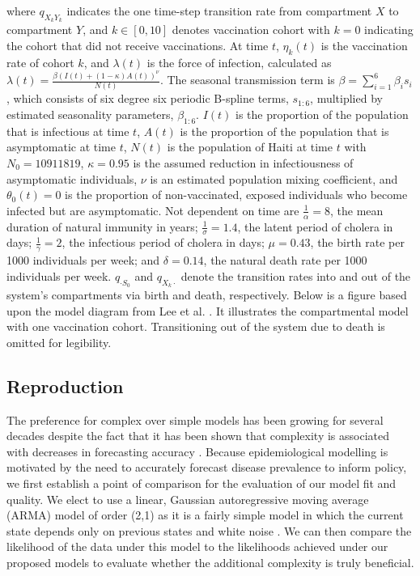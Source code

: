 \documentclass[12pt]{article}
\begin{document}
\noindent where $q_{X_kY_k}$ indicates the one time-step transition rate from compartment $X$ to compartment $Y$, and $k \in [0, 10]$ denotes vaccination cohort with $k = 0$ indicating the cohort that did not receive vaccinations. At time $t$, $\eta_k(t)$ is the vaccination rate of cohort $k$, and $\lambda (t)$ is the force of infection, calculated as $\lambda(t) = \frac{\beta(I(t) + (1-\kappa)A(t))^\nu}{N(t)}$. The seasonal transmission term is $\beta = \sum_{i = 1}^6 \beta_i s_i$, which consists of six degree six periodic B-spline terms, $s_{1:6}$, multiplied by estimated seasonality parameters, $\beta_{1:6}$. $I(t)$ is the proportion of the population that is infectious at time $t$, $A(t)$ is the proportion of the population that is asymptomatic at time $t$, $N(t)$ is the population of Haiti at time $t$ with $N_0 = 10911819$, $\kappa = 0.95$ is the assumed reduction in infectiousness of asymptomatic individuals, $\nu$ is an estimated population mixing coefficient, and $\theta_0(t) = 0$ is the proportion of non-vaccinated, exposed individuals who become infected but are asymptomatic. Not dependent on time are $\frac{1}{\alpha} = 8$, the mean duration of natural immunity in years; $\frac{1}{\sigma} = 1.4$, the latent period of cholera in days; $\frac{1}{\gamma} = 2$, the infectious period of cholera in days; $\mu = 0.43$, the birth rate per 1000 individuals per week; and $\delta = 0.14$, the natural death rate per 1000 individuals per week. $q_{\cdot S_0}$ and $q_{X_k \cdot}$ denote the transition rates into and out of the system's compartments via birth and death, respectively. Below is a figure based upon the model diagram from Lee et al. \cite{Lee_supp}. It illustrates the compartmental model with one vaccination cohort. Transitioning out of the system due to death is omitted for legibility.

\subsection{Reproduction}

 The preference for complex over simple models has been growing for several decades despite the fact that it has been shown that complexity is associated with decreases in forecasting accuracy \cite{Green}. Because epidemiological modelling is motivated by the need to accurately forecast disease prevalence to inform policy, we first establish a point of comparison for the evaluation of our model fit and quality. We elect to use a linear, Gaussian autoregressive moving average (ARMA) model of order (2,1) as it is a fairly simple model in which the current state depends only on previous states and white noise \cite{Shumway_ch3}. We can then compare the likelihood of the data under this model to the likelihoods achieved under our proposed models to evaluate whether the additional complexity is truly beneficial.
  
\end{document}
